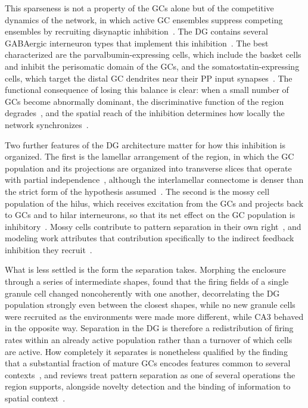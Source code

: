 This sparseness is not a property of the GCs alone but of the competitive dynamics of the network, in which active GC ensembles
suppress competing ensembles by recruiting disynaptic inhibition~\parencite{hainmuellerDentate2020}. The DG contains several
GABAergic interneuron types that implement this inhibition~\parencite{degroInterneuron2022}. The best characterized are the
parvalbumin-expressing cells, which include the basket cells and inhibit the perisomatic domain of the GCs, and the
somatostatin-expressing cells, which target the distal GC dendrites near their PP input
synapses~\parencite{hainmuellerDentate2020}. The functional consequence of losing this balance is clear: when a small number
of GCs become abnormally dominant, the discriminative function of the region degrades~\parencite{scharfmanCorruption2016}, and the
spatial reach of the inhibition determines how locally the network synchronizes~\parencite{struberDistancedependent2017}.

Two further features of the DG architecture matter for how this inhibition is organized. The first is the lamellar arrangement of
the region, in which the GC population and its projections are organized into transverse slices that operate with partial
independence~\parencite{sloviterUpdating2012}, although the interlamellar connectome is denser than the strict form of the
hypothesis assumed~\parencite{pakHippocampal2022}. The second is the mossy cell population of the hilus, which receives excitation
from the GCs and projects back to GCs and to hilar interneurons, so that its net effect on the GC population is
inhibitory~\parencite{scharfmanHilar2013}. Mossy cells contribute to pattern separation in their own
right~\parencite{goodsmithDentate2019}, and modeling work attributes that contribution specifically to the indirect feedback
inhibition they recruit~\parencite{galloniRecurrent2022}.

What is less settled is the form the separation takes. Morphing the enclosure through a series of intermediate shapes,
\textcite{leutgebPattern2007} found that the firing fields of a single granule cell changed noncoherently with one another,
decorrelating the DG population strongly even between the closest shapes, while no new granule cells were recruited as the
environments were made more different, while CA3 behaved in the opposite way. Separation in the DG is therefore a redistribution
of firing rates within an already active population rather than a turnover of which cells are active. How completely it separates
is nonetheless qualified by the finding that a substantial fraction of mature GCs encodes features common to several
contexts~\parencite{hainmuellerDentate2020}, and reviews treat pattern separation as one of several operations the region
supports, alongside novelty detection and the binding of information to spatial context~\parencite{kesnerAnalysis2018}.

